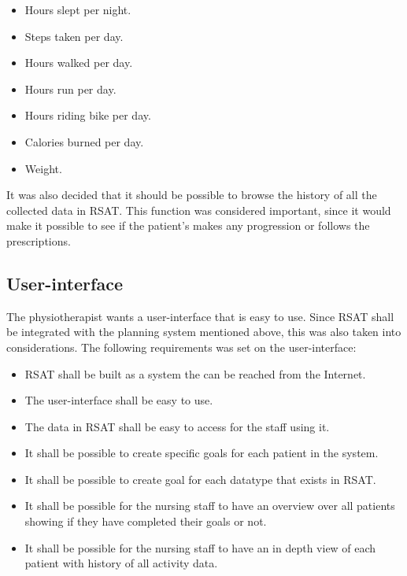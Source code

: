 \documentclass{cslthse-msc}
\begin{document}
\begin{itemize}
    \item Hours slept per night.
    \item Steps taken per day.
    \item Hours walked per day.
    \item Hours run per day.
    \item Hours riding bike per day.
    \item Calories burned per day.
    \item Weight.
\end{itemize}

It was also decided that it should be possible to browse the history of all the collected data in RSAT. This function was considered important, since it would make it possible to see if the patient’s makes any progression or follows the prescriptions.

\subsection{User-interface}
The physiotherapist wants a user-interface that is easy to use. Since RSAT shall be integrated with the planning system mentioned above, this was also taken into considerations. The following requirements was set on the user-interface:

\begin{itemize}
    \item RSAT shall be built as a system the can be reached from the Internet.
    \item The user-interface shall be easy to use.
    \item The data in RSAT shall be easy to access for the staff using it.
    \item It shall be possible to create specific goals for each patient in the system.
    \item It shall be possible to create goal for each datatype that exists in RSAT.
    \item It shall be possible for the nursing staff to have an overview over all patients showing if they have completed their goals or not. 

    \item It shall be possible for the nursing staff to have an in depth view of each patient with history of all activity data.

\end{itemize}
\end{document}
